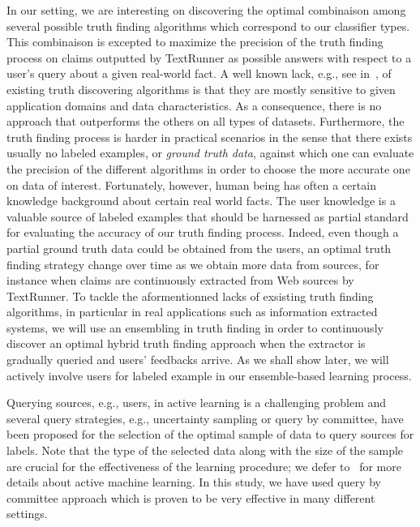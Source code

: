In our setting, we are interesting on discovering the optimal combinaison among several possible truth finding algorithms
which correspond to our classifier types.
This combinaison is excepted to maximize the precision of the truth finding process on claims outputted by TextRunner as 
possible answers with respect to a user's query about a given real-world fact.
A well known lack, e.g., see in~\cite{Li12, Wagui14}, of existing truth discovering algorithms is that they are mostly sensitive
to given application domains and data characteristics. As a consequence, there is no approach that outperforms the others on all 
types of datasets. Furthermore, the truth finding process is harder in practical scenarios in the sense that there exists usually 
no labeled examples, or \emph{ground truth data}, against which one can evaluate the precision of the different algorithms in order to choose
the more accurate one on data of interest.  Fortunately, however, human being has often a certain knowledge background about certain real world facts.
The user knowledge is a valuable source of labeled examples that should be harnessed as partial standard for evaluating the accuracy of our truth finding 
process. Indeed, even though a partial ground truth data could be obtained from the users, an optimal truth finding strategy change over time as we obtain
more data from sources, for instance when claims are continuously extracted from Web sources by TextRunner.
To tackle the aformentionned lacks of exsisting truth finding algorithms, in particular in real applications such as information extracted systems, 
we will use an ensembling in truth finding in order to continuously discover an optimal hybrid truth finding approach when the extractor is gradually
queried and users' feedbacks arrive. As we shall show later, we will actively involve users for labeled example in our ensemble-based learning process.

Querying sources, e.g., users, in active learning is a challenging problem and several query strategies, e.g., uncertainty sampling or query by committee, 
have been proposed for the selection of the optimal sample of data to query sources for labels. Note that the type of the selected data along with the size
of the sample are crucial for the effectiveness of the learning procedure; we defer to~\cite{burr12} for more details about active machine learning. 
In this study, we have used query by committee approach which is proven to be very effective in many different settings.


